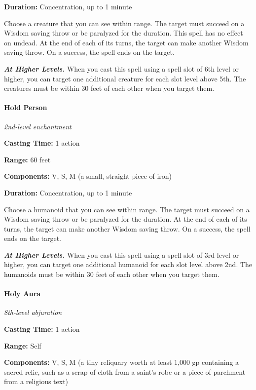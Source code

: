 \documentclass[
]{article}
\begin{document}
\textbf{Duration:} Concentration, up to 1 minute

Choose a creature that you can see within range. The target must succeed
on a Wisdom saving throw or be paralyzed for the duration. This spell
has no effect on undead. At the end of each of its turns, the target can
make another Wisdom saving throw. On a success, the spell ends on the
target.

\emph{\textbf{At Higher Levels.}} When you cast this spell using a spell
slot of 6th level or higher, you can target one additional creature for
each slot level above 5th. The creatures must be within 30 feet of each
other when you target them.

\hypertarget{hold-person}{%
\paragraph{Hold Person}\label{hold-person}}

\emph{2nd-level enchantment}

\textbf{Casting Time:} 1 action

\textbf{Range:} 60 feet

\textbf{Components:} V, S, M (a small, straight piece of iron)

\textbf{Duration:} Concentration, up to 1 minute

Choose a humanoid that you can see within range. The target must succeed
on a Wisdom saving throw or be paralyzed for the duration. At the end of
each of its turns, the target can make another Wisdom saving throw. On a
success, the spell ends on the target.

\emph{\textbf{At Higher Levels.}} When you cast this spell using a spell
slot of 3rd level or higher, you can target one additional humanoid for
each slot level above 2nd. The humanoids must be within 30 feet of each
other when you target them.

\hypertarget{holy-aura}{%
\paragraph{Holy Aura}\label{holy-aura}}

\emph{8th-level abjuration}

\textbf{Casting Time:} 1 action

\textbf{Range:} Self

\textbf{Components:} V, S, M (a tiny reliquary worth at least 1,000 gp
containing a sacred relic, such as a scrap of cloth from a saint's robe
or a piece of parchment from a religious text)
\end{document}
